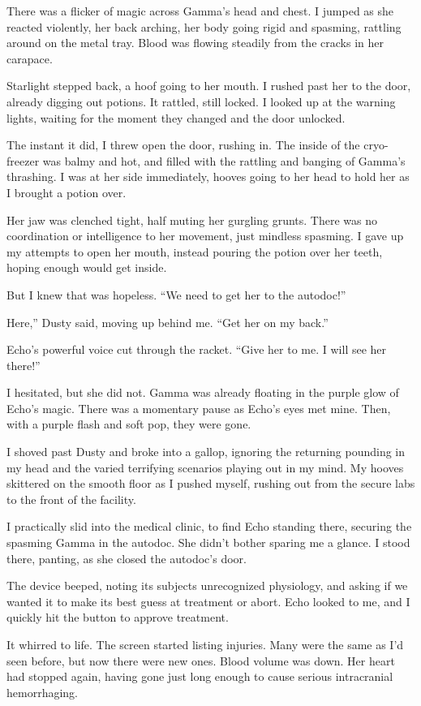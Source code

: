 There was a flicker of magic across Gamma’s head and chest. I jumped as she reacted violently, her back arching, her body going rigid and spasming, rattling around on the metal tray. Blood was flowing steadily from the cracks in her carapace.

Starlight stepped back, a hoof going to her mouth. I rushed past her to the door, already digging out potions. It rattled, still locked. I looked up at the warning lights, waiting for the moment they changed and the door unlocked.

The instant it did, I threw open the door, rushing in. The inside of the cryo-freezer was balmy and hot, and filled with the rattling and banging of Gamma’s thrashing. I was at her side immediately, hooves going to her head to hold her as I brought a potion over.

Her jaw was clenched tight, half muting her gurgling grunts. There was no coordination or intelligence to her movement, just mindless spasming. I gave up my attempts to open her mouth, instead pouring the potion over her teeth, hoping enough would get inside.

But I knew that was hopeless. “We need to get her to the autodoc!”

\leavevmode{}Here,” Dusty said, moving up behind me. “Get her on my back.”

Echo’s powerful voice cut through the racket. “Give her to me. I will see her there!”

I hesitated, but she did not. Gamma was already floating in the purple glow of Echo’s magic. There was a momentary pause as Echo’s eyes met mine. Then, with a purple flash and soft pop, they were gone.

I shoved past Dusty and broke into a gallop, ignoring the returning pounding in my head and the varied terrifying scenarios playing out in my mind. My hooves skittered on the smooth floor as I pushed myself, rushing out from the secure labs to the front of the facility.

I practically slid into the medical clinic, to find Echo standing there, securing the spasming Gamma in the autodoc. She didn’t bother sparing me a glance. I stood there, panting, as she closed the autodoc’s door.

The device beeped, noting its subjects unrecognized physiology, and asking if we wanted it to make its best guess at treatment or abort. Echo looked to me, and I quickly hit the button to approve treatment.

It whirred to life. The screen started listing injuries. Many were the same as I’d seen before, but now there were new ones. Blood volume was down. Her heart had stopped again, having gone just long enough to cause serious intracranial hemorrhaging.

